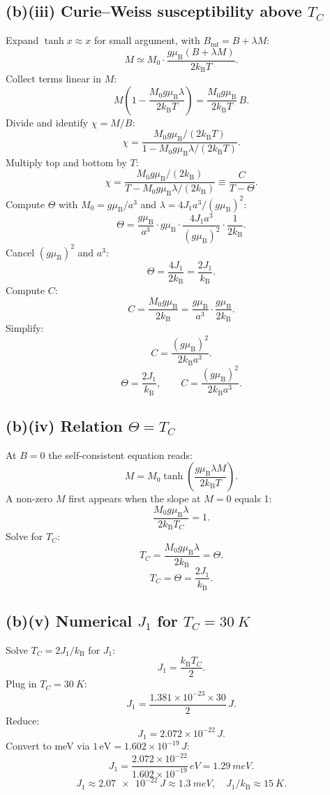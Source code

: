 \documentclass[11pt]{article}
\newcommand{\kB}{k_{\mathrm{B}}}
\newcommand{\muB}{\mu_{\mathrm{B}}}
\begin{document}
\subsection*{(b)(iii) Curie--Weiss susceptibility above $T_C$}

Expand $\tanh x\approx x$ for small argument, with $B_{\mathrm{mf}}=B+\lambda M$:
\[
M \simeq M_0\cdot\frac{g\muB(B+\lambda M)}{2\kB T}.
\]
Collect terms linear in $M$:
\[
M\!\left(1 - \frac{M_0 g\muB \lambda}{2\kB T}\right) = \frac{M_0 g\muB}{2\kB T}\,B.
\]
Divide and identify $\chi=M/B$:
\[
\chi = \frac{M_0 g\muB/(2\kB T)}{1 - M_0 g\muB \lambda/(2\kB T)}.
\]
Multiply top and bottom by $T$:
\[
\chi = \frac{M_0 g\muB/(2\kB)}{T - M_0 g\muB \lambda/(2\kB)} \equiv \frac{C}{T-\Theta}.
\]
Compute $\Theta$ with $M_0=g\muB/a^3$ and $\lambda=4J_1 a^3/(g\muB)^2$:
\[
\Theta = \frac{g\muB}{a^3}\cdot g\muB\cdot\frac{4J_1 a^3}{(g\muB)^2}\cdot\frac{1}{2\kB}.
\]
Cancel $(g\muB)^2$ and $a^3$:
\[
\Theta = \frac{4J_1}{2\kB} = \frac{2J_1}{\kB}.
\]
Compute $C$:
\[
C = \frac{M_0 g\muB}{2\kB} = \frac{g\muB}{a^3}\cdot\frac{g\muB}{2\kB}.
\]
Simplify:
\[
C = \frac{(g\muB)^2}{2\kB a^3}.
\]
\begin{equation}
\boxed{\ \Theta = \frac{2J_1}{\kB},\qquad C = \frac{(g\muB)^2}{2\kB a^3}.\ }
\label{eq:CWbox}
\end{equation}

\subsection*{(b)(iv) Relation $\Theta = T_C$}

At $B=0$ the self-consistent equation reads:
\[
M = M_0\tanh\!\left(\frac{g\muB\lambda M}{2\kB T}\right).
\]
A non-zero $M$ first appears when the slope at $M=0$ equals 1:
\[
\frac{M_0 g\muB \lambda}{2\kB T_C} = 1.
\]
Solve for $T_C$:
\[
T_C = \frac{M_0 g\muB \lambda}{2\kB} = \Theta.
\]
\begin{equation}
\boxed{\ T_C = \Theta = \frac{2J_1}{\kB}.\ }
\label{eq:TCbox}
\end{equation}

\subsection*{(b)(v) Numerical $J_1$ for $T_C=\SI{30}{K}$}

Solve $T_C = 2J_1/\kB$ for $J_1$:
\[
J_1 = \frac{\kB T_C}{2}.
\]
Plug in $T_C=\SI{30}{K}$:
\[
J_1 = \frac{1.381\times 10^{-23}\times 30}{2}\,\si{J}.
\]
Reduce:
\[
J_1 = 2.072\times 10^{-22}\,\si{J}.
\]
Convert to meV via $1\,\mathrm{eV} = 1.602\times 10^{-19}\,\si{J}$:
\[
J_1 = \frac{2.072\times 10^{-22}}{1.602\times 10^{-19}}\,\si{eV} = \SI{1.29}{meV}.
\]
\begin{equation}
\boxed{\ J_1 \approx \SI{2.07e-22}{J} \approx \SI{1.3}{meV},\quad J_1/\kB \approx \SI{15}{K}.\ }
\label{eq:J1box}
\end{equation}
\end{document}

